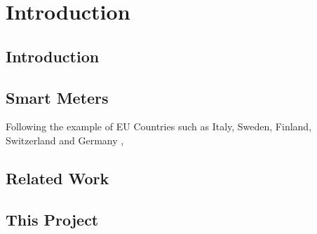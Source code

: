 \chapter{Introduction}
\section{Introduction}
\section{Smart Meters}
Following the example of EU Countries such as Italy, Sweden, Finland, Switzerland and Germany \cite{OfGEM}\cite{Vasc}, 
\section{Related Work}
\section{This Project}
